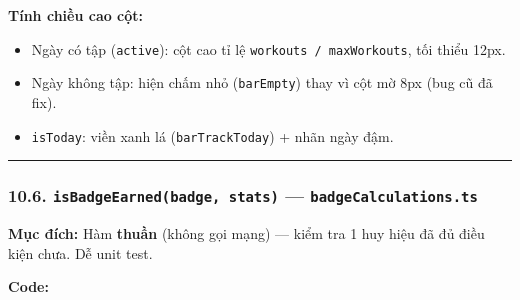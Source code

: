 \documentclass[12pt,a4paper]{article}
\newenvironment{Shaded}{%
  \VerbatimEnvironment
  \begin{quote}\small\ttfamily
}{%
  \end{quote}%
}
\providecommand{\tightlist}{%
  \setlength{\itemsep}{0pt}\setlength{\parskip}{0pt}}
\begin{document}
\textbf{Tính chiều cao cột:}

\begin{Shaded}
\begin{Highlighting}[]
\OperatorTok{=}
   \NormalTok{(}\OperatorTok{,} \OperatorTok{/}\OperatorTok{*}
  \OperatorTok{:} \OperatorTok{;}
\end{Highlighting}
\end{Shaded}

\begin{itemize}
\tightlist
\item
  Ngày có tập (\texttt{active}): cột cao tỉ lệ
  \texttt{workouts\ /\ maxWorkouts}, tối thiểu 12px.
\item
  Ngày không tập: hiện chấm nhỏ (\texttt{barEmpty}) thay vì cột mờ 8px
  (bug cũ đã fix).
\item
  \texttt{isToday}: viền xanh lá (\texttt{barTrackToday}) + nhãn ngày
  đậm.
\end{itemize}

\begin{center}\rule{0.5\linewidth}{0.5pt}\end{center}

\subsubsection{\texorpdfstring{10.6.
\texttt{isBadgeEarned(badge,\ stats)} ---
\texttt{badgeCalculations.ts}}{10.6. isBadgeEarned(badge, stats) --- badgeCalculations.ts}}\label{isbadgeearnedbadge-stats-badgecalculations.ts}

\textbf{Mục đích:} Hàm \textbf{thuần} (không gọi mạng) --- kiểm tra 1
huy hiệu đã đủ điều kiện chưa. Dễ unit test.

\textbf{Code:}
\end{document}
